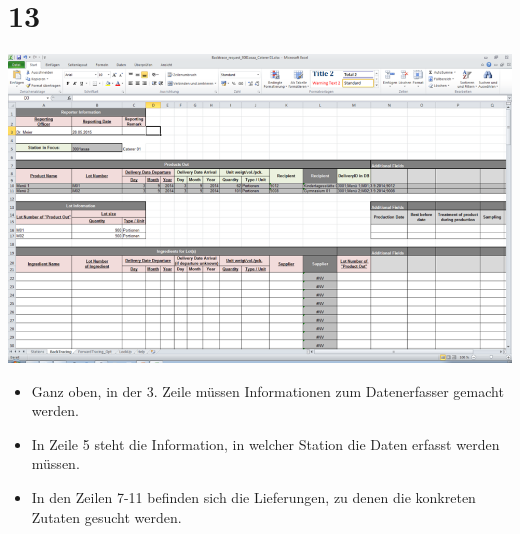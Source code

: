 \documentclass{beamer}
\begin{document}
\section{13}
\begin{frame}
	\begin{center}
  		\includegraphics[height=0.65\textheight]{13.png}
	\end{center}
	\begin{itemize}
		\item Ganz oben, in der 3. Zeile müssen Informationen zum Datenerfasser gemacht werden.
		\item In Zeile 5 steht die Information, in welcher Station die Daten erfasst werden müssen.
		\item In den Zeilen 7-11 befinden sich die Lieferungen, zu denen die konkreten Zutaten gesucht werden.
	\end{itemize}
\end{frame}
\end{document}
